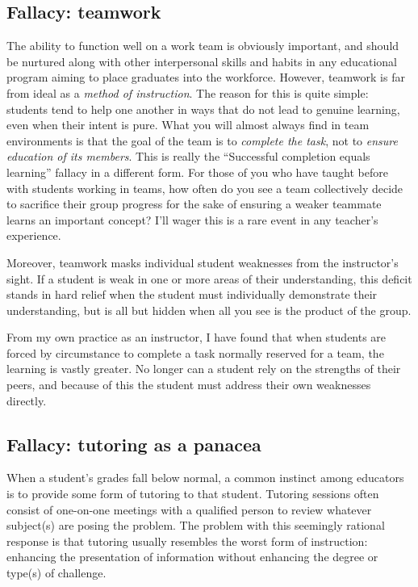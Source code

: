 \subsection{Fallacy: teamwork}

The ability to function well on a work team is obviously important, and should be nurtured along with other interpersonal skills and habits in any educational program aiming to place graduates into the workforce.  However, teamwork is far from ideal as a \textit{method of instruction}.  The reason for this is quite simple: students tend to help one another in ways that do not lead to genuine learning, even when their intent is pure.  What you will almost always find in team environments is that the goal of the team is to \textit{complete the task}, not to \textit{ensure education of its members}.  This is really the ``Successful completion equals learning'' fallacy in a different form.  For those of you who have taught before with students working in teams, how often do you see a team collectively decide to sacrifice their group progress for the sake of ensuring a weaker teammate learns an important concept?  I'll wager this is a rare event in any teacher's experience.

Moreover, teamwork masks individual student weaknesses from the instructor's sight.  If a student is weak in one or more areas of their understanding, this deficit stands in hard relief when the student must individually demonstrate their understanding, but is all but hidden when all you see is the product of the group.  

From my own practice as an instructor, I have found that when students are forced by circumstance to complete a task normally reserved for a team, the learning is vastly greater.  No longer can a student rely on the strengths of their peers, and because of this the student must address their own weaknesses directly.





\subsection{Fallacy: tutoring as a panacea}

When a student's grades fall below normal, a common instinct among educators is to provide some form of tutoring to that student.  Tutoring sessions often consist of one-on-one meetings with a qualified person to review whatever subject(s) are posing the problem.  The problem with this seemingly rational response is that tutoring usually resembles the worst form of instruction: enhancing the presentation of information without enhancing the degree or type(s) of challenge.

